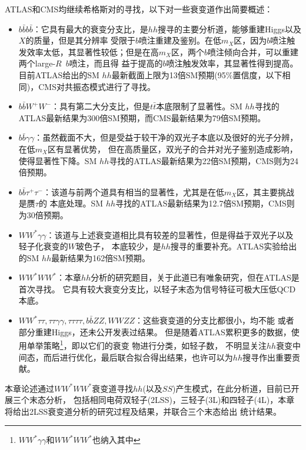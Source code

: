 \RunTwo ATLAS和CMS均继续希格斯对的寻找，以下对一些衰变道作出简要概述：
\begin{itemize}
 \item $b\bar{b}b\bar{b}$：它具有最大的衰变分支比，是$hh$搜寻的主要分析道，能够重建Higgs以及$X$的质量，但是其分辨率
受限于$b$喷注重建及鉴别。在低$m_X$区，因为$b$喷注触发效率太低，其显著性较低；但是在高$m_X$区，两个$b$喷注倾向合并，可以重建两个large-$R$~$b$喷注，而且得
益于提高的$b$喷注触发效率，其显著性得到提高。目前ATLAS给出的SM $hh$最新截面上限为13倍SM预期\cite{Aaboud:2018knk}(95\%置信度，以下相同)，CMS对共振态模式进行了寻找\cite{Sirunyan:2018zkk}。
 \item $b\bar{b}W^{+}W^{-}$：具有第二大分支比，但是$t\bar{t}$本底限制了显著性。SM $hh$寻找的ATLAS最新结果为300倍SM预期\cite{Aaboud:2018zhh}，而CMS最新结果为79倍SM预期\cite{Sirunyan:2017guj}。
 \item $b\bar{b}\gamma\gamma$：虽然截面不大，但是受益于较干净的双光子本底以及很好的光子分辨，在低$m_X$区有显著优势，
 但在高质量区，双光子的合并对光子鉴别造成影响，使得显著性下降。SM $hh$寻找的ATLAS最新结果为22倍SM预期\cite{Aaboud:2018ftw}，CMS则为24倍预期\cite{Sirunyan:2018iwt}。
 \item $b\bar{b}\tau^{+}\tau^{-}$：该道与前两个道具有相当的显著性，尤其是在低$m_X$区，其主要挑战是赝$\tau$的
本底处理。SM $hh$寻找的ATLAS最新结果为12.7倍SM预期\cite{Aaboud:2018sfw}，CMS则为30倍预期\cite{Sirunyan:2017djm}。
 \item $WW^{*}\gamma\gamma$：该道与上述衰变道相比具有较差的显著性，但是得益于双光子以及轻子化衰变的$W$玻色子，
本底较少，是$hh$搜寻的重要补充。ATLAS实验给出的SM $hh$最新结果为162倍SM预期\cite{Aaboud:2018ewm}。
 \item $WW^{*}WW^{*}$：本章$hh$分析的研究题目，关于此道已有唯象研究\cite{4WTheory}，但在ATLAS是首次寻找。
它具有较大衰变分支比，以轻子末态为信号特征可极大压低QCD本底。
 \item $WW^{*}\tau\tau, \tau\tau\gamma\gamma, \tau\tau\tau\tau, b\bar{b}ZZ, WWZZ$：这些衰变道的分支比都很小，均不能
或者部分重建Higgs，还未公开发表过结果。
 但是随着ATLAS累积更多的数据，使用单举策略\footnote{$WW^{*}\gamma\gamma$和$WW^{*}WW^{*}$也纳入其中}，即以它们的衰变
物进行分类，如轻子数，
 不明显关注$hh$衰变中间态，而后进行优化，最后联合拟合得出结果，也许可以为$hh$搜寻作出重要贡献。
\end{itemize}

本章论述通过$WW^{*}WW^{*}$衰变道寻找$hh$(以及$SS$)产生模式，在此分析道，目前已开展三个末态分析，
包括相同电荷双轻子(2LSS)，三轻子(3L)和四轻子(4L)，本章将给出2LSS衰变道分析的研究过程及结果，并联合三个末态给出
统计结果。
